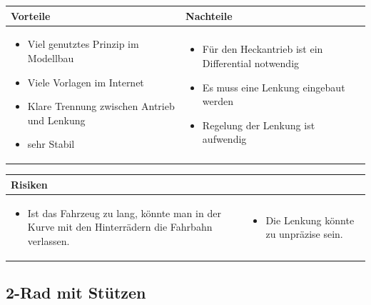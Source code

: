 \begin{table}[h]
\begin{tabular}{p{} | p{}}


 \textbf{Vorteile} & \textbf{Nachteile} \\ \hline
	 
\begin{itemize}
\item Viel genutztes Prinzip im Modellbau
\item Viele Vorlagen im Internet
\item Klare Trennung zwischen Antrieb und Lenkung
\item sehr Stabil
\end{itemize}

 
 &
 
\begin{itemize}
\item Für den Heckantrieb ist ein Differential notwendig
\item Es muss eine Lenkung eingebaut werden 
\item Regelung der Lenkung ist aufwendig
\end{itemize}

\end{tabular}
\end{table}

\begin{table}[h]
\begin{tabular}{p{}p{}}


 \textbf{Risiken} & \\ \hline
	 
\begin{itemize}
\item Ist das Fahrzeug zu lang, könnte man in der Kurve mit den Hinterrädern die Fahrbahn verlassen.
\end{itemize}
&
\begin{itemize}
\item Die Lenkung könnte zu unpräzise sein.
\end{itemize}

 
\end{tabular}
\end{table}

\pagebreak


\subsection{2-Rad mit Stützen}

